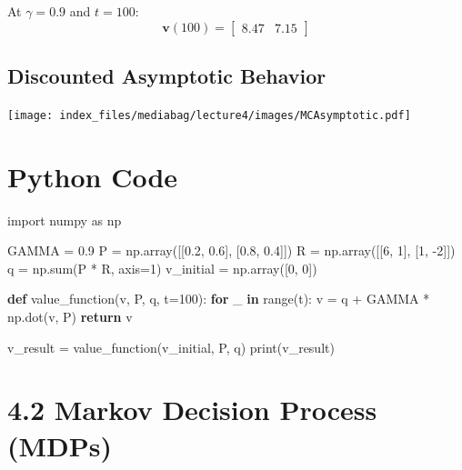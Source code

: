 \documentclass[
  letterpaper,
  DIV=11,
  numbers=noendperiod]{scrreprt}
\newenvironment{Shaded}{\begin{snugshade}}{\end{snugshade}}
\newcommand{\BuiltInTok}[1]{\textcolor[rgb]{0.00,0.23,0.31}{#1}}
\newcommand{\ControlFlowTok}[1]{\textcolor[rgb]{0.00,0.23,0.31}{\textbf{#1}}}
\newcommand{\DecValTok}[1]{\textcolor[rgb]{0.68,0.00,0.00}{#1}}
\newcommand{\FloatTok}[1]{\textcolor[rgb]{0.68,0.00,0.00}{#1}}
\newcommand{\ImportTok}[1]{\textcolor[rgb]{0.00,0.46,0.62}{#1}}
\newcommand{\KeywordTok}[1]{\textcolor[rgb]{0.00,0.23,0.31}{\textbf{#1}}}
\newcommand{\NormalTok}[1]{\textcolor[rgb]{0.00,0.23,0.31}{#1}}
\newcommand{\OperatorTok}[1]{\textcolor[rgb]{0.37,0.37,0.37}{#1}}
\begin{document}
At \(\gamma=0.9\) and \(t=100\): \[
\mathbf{v}(100) = \begin{bmatrix} 8.47 & 7.15 \end{bmatrix}
\]

\section{Discounted Asymptotic
Behavior}\label{discounted-asymptotic-behavior}

\texttt{[image: index\_files/mediabag/lecture4/images/MCAsymptotic.pdf]}

\chapter{Python Code}\label{python-code}

\begin{Shaded}
\begin{Highlighting}[]
\ImportTok{import}\NormalTok{ numpy }\ImportTok{as}\NormalTok{ np}

\NormalTok{GAMMA }\OperatorTok{=} \FloatTok{0.9}
\NormalTok{P }\OperatorTok{=}\NormalTok{ np.array([[}\FloatTok{0.2}\NormalTok{, }\FloatTok{0.6}\NormalTok{], [}\FloatTok{0.8}\NormalTok{, }\FloatTok{0.4}\NormalTok{]])}
\NormalTok{R }\OperatorTok{=}\NormalTok{ np.array([[}\DecValTok{6}\NormalTok{, }\DecValTok{1}\NormalTok{], [}\DecValTok{1}\NormalTok{, }\OperatorTok{{-}}\DecValTok{2}\NormalTok{]])}
\NormalTok{q }\OperatorTok{=}\NormalTok{ np.}\BuiltInTok{sum}\NormalTok{(P }\OperatorTok{*}\NormalTok{ R, axis}\OperatorTok{=}\DecValTok{1}\NormalTok{)}
\NormalTok{v\_initial }\OperatorTok{=}\NormalTok{ np.array([}\DecValTok{0}\NormalTok{, }\DecValTok{0}\NormalTok{])}

\KeywordTok{def}\NormalTok{ value\_function(v, P, q, t}\OperatorTok{=}\DecValTok{100}\NormalTok{):}
    \ControlFlowTok{for}\NormalTok{ \_ }\KeywordTok{in} \BuiltInTok{range}\NormalTok{(t):}
\NormalTok{        v }\OperatorTok{=}\NormalTok{ q }\OperatorTok{+}\NormalTok{ GAMMA }\OperatorTok{*}\NormalTok{ np.dot(v, P)}
    \ControlFlowTok{return}\NormalTok{ v}

\NormalTok{v\_result }\OperatorTok{=}\NormalTok{ value\_function(v\_initial, P, q)}
\BuiltInTok{print}\NormalTok{(v\_result)}
\end{Highlighting}
\end{Shaded}

\chapter{4.2 Markov Decision Process
(MDPs)}\label{markov-decision-process-mdps}
\end{document}
